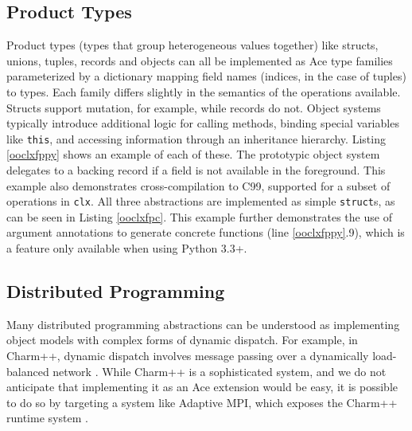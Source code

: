 \documentclass[9pt,preprint]{sigplanconf}
\begin{document}
\subsection{Product Types}
Product types (types that group heterogeneous values together) like structs, unions, tuples, records and objects can all be implemented as Ace type families  parameterized by a dictionary mapping field names (indices, in the case of tuples) to types. Each family differs slightly in the semantics of the operations available. Structs support mutation, for example, while records do not. Object systems typically introduce additional logic for calling methods, binding special variables like \verb|this|, and accessing information through an inheritance hierarchy. Listing \ref{ooclxfppy} shows an example of each of these. The prototypic object system delegates to a backing record if a field is not available in the foreground. This example also demonstrates cross-compilation to C99, supported for a subset of operations in \verb|clx|. All three abstractions are implemented as simple \verb|struct|s, as can be seen in Listing \ref{ooclxfpc}. This example further demonstrates the use of argument annotations to generate concrete functions (line \ref{ooclxfppy}.9), which is a feature only available when using Python 3.3+. 

\subsection{Distributed Programming}
Many distributed programming abstractions can be understood as implementing object models with complex forms of dynamic dispatch. For example, in Charm++, dynamic dispatch involves message passing over a dynamically load-balanced network \cite{kale2009charm++}. While Charm++ is a sophisticated system, and we do not anticipate that implementing it as an Ace extension would be easy, it is possible to do so by targeting a system like Adaptive MPI, which exposes the Charm++ runtime system \cite{kale2009charm++}. %

%
\end{document}
